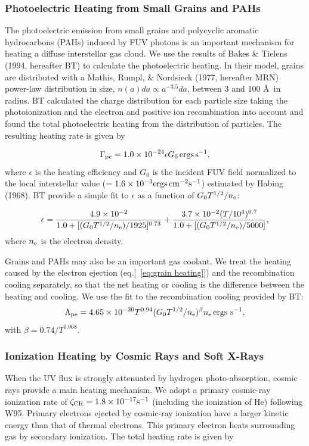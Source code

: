\subsubsection{Photoelectric Heating from Small Grains and PAHs}
The photoelectric emission from small grains and polycyclic aromatic 
hydrocarbons (PAHs) induced by FUV photons is an important mechanism
for heating a diffuse interstellar gas cloud.
We use the results of Bakes \& Tielens (1994, hereafter BT)
to calculate the photoelectric heating.
In their model, grains are distributed with a 
Mathis, Rumpl, \& Nordsieck (1977, hereafter MRN)
power-law distribution in size, $n(a)da\propto a^{-3.5}da$, 
between 3 and 100 \AA \, in radius.
BT calculated the charge distribution for each particle size taking the
photoionization and the electron and positive ion recombination into account 
and found the total photoelectric heating from the distribution of particles.
The resulting heating rate is given by

\begin{equation}
\Gamma_{\rm pe}=1.0\times 10^{-24}\epsilon G_0\,
{\rm ergs \,s^{-1}},
\label{eq:grain heating}
\end{equation}
where $\epsilon$ is the heating efficiency
and $G_0$ is the incident FUV field normalized to 
the local interstellar value
($=1.6\times 10^{-3} {\rm ergs \, cm^{-2}s^{-1}}$)
estimated by Habing (1968).
BT provide a simple fit to $\epsilon$ as a function of
$G_0 T^{1/2}/n_{\rm e}$:

\begin{equation}
\epsilon =
\frac{4.9\times 10^{-2}}{1.0+[(G_0T^{1/2}/n_{\rm e})/1925]^{0.73}}
+\frac{3.7\times 10^{-2}(T/10^4)^{0.7}}
{1.0+[(G_0T^{1/2}/n_{\rm e})/5000]},
\end{equation}
where $n_{\rm e}$ is the electron density.

Grains and PAHs may also be an important gas coolant.
We treat the heating caused by the electron ejection 
(eq.[~\ref{eq:grain heating}]) and the recombination cooling separately, 
so that the net heating or cooling is the difference between the heating 
and cooling.
We use the fit to the recombination cooling provided by BT:
\begin{equation}
\Lambda_{\rm pe}=
4.65\times 10^{-30}T^{0.94}(G_0T^{1/2}/n_{\rm e})^{\beta}n_{\rm e}\,
{\rm ergs \ s^{-1}},
\end{equation}
with $\beta=0.74/T^{0.068}$.

\subsubsection{Ionization Heating by Cosmic Rays and Soft X-Rays}
When the UV flux is strongly attenuated by hydrogen photo-absorption,
cosmic rays provide a main heating mechanism.
We adopt a primary cosmic-ray ionization rate of 
$\zeta_{\rm CR}=1.8\times 10^{-17} {\rm s^{-1}}$ 
(including the ionization of He) following W95.
Primary electrons ejected by cosmic-ray ionization have a larger kinetic 
energy than that of thermal electrons. 
This primary electron heats surrounding gas by secondary ionization.
The total heating rate is given by

